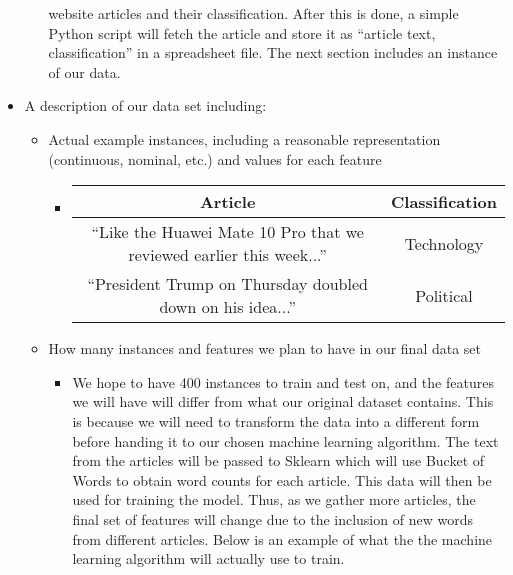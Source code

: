 \documentclass[fleqn,11pt]{article}
\begin{document}
\begin{itemize}
\begin{itemize}
        website articles and their classification. After this is done, a simple Python script 
        will fetch the article and store it as ``article text, classification'' in a spreadsheet file. 
        The next section includes an instance of our data.
      \end{itemize}
    \item A description of our data set including:
      \begin{itemize}
        \item Actual example instances, including a reasonable representation (continuous, nominal, etc.) and values for each feature
          \begin{itemize}
            \item
            \begin{tabular}{|cc|}
              \hline
              Article                                                             & Classification\\
              \hline
              “Like the Huawei Mate 10 Pro that we reviewed earlier this week...” & Technology\\
              “President Trump on Thursday doubled down on his idea...”           & Political\\
              \hline
            \end{tabular}
          \end{itemize}
        \item How many instances and features we plan to have in our final data set
          \begin{itemize}
            \item 
            We hope to have 400 instances to train and test on, and the features we will have will 
            differ from what our original dataset contains. This is because we will need to transform the 
            data into a different form before handing it to our chosen machine learning algorithm. The text from 
            the articles will be passed to Sklearn which will use Bucket of Words to obtain word counts 
            for each article. This data will then be used for training the model. Thus, as 
            we gather more articles, the final set of features will change due to the inclusion of new 
            words from different articles. Below is an example of what the the machine learning algorithm 
            will actually use to train.
      
            \medskip
            \medskip
            

\end{itemize}
\end{itemize}
\end{itemize}
\end{document}
